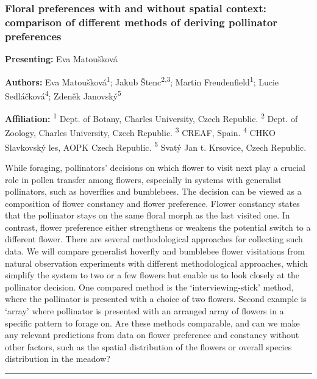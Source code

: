 \documentclass[
  letterpaper,
  DIV=11,
  numbers=noendperiod]{scrartcl}
\begin{document}
\subsubsection{Floral preferences with and without spatial context:
comparison of different methods of deriving pollinator
preferences}\label{floral-preferences-with-and-without-spatial-context-comparison-of-different-methods-of-deriving-pollinator-preferences}

\textbf{Presenting:} Eva Matoušková

\textbf{Authors:} Eva Matoušková\textsuperscript{1}; Jakub
Štenc\textsuperscript{2,3}; Martin Freudenfield\textsuperscript{1};
Lucie Sedláčková\textsuperscript{4}; Zdeněk Janovský\textsuperscript{5}

\textbf{Affiliation:} \textsuperscript{1} Dept. of Botany, Charles
University, Czech Republic. \textsuperscript{2} Dept. of Zoology,
Charles University, Czech Republic. \textsuperscript{3} CREAF, Spain.
\textsuperscript{4} CHKO Slavkovský les, AOPK Czech Republic.
\textsuperscript{5} Svatý Jan t. Krsovice, Czech Republic.

While foraging, pollinators' decisions on which flower to visit next
play a crucial role in pollen transfer among flowers, especially in
systems with generalist pollinators, such as hoverflies and bumblebees.
The decision can be viewed as a composition of flower constancy and
flower preference. Flower constancy states that the pollinator stays on
the same floral morph as the last visited one. In contrast, flower
preference either strengthens or weakens the potential switch to a
different flower. There are several methodological approaches for
collecting such data. We will compare generalist hoverfly and bumblebee
flower visitations from natural observation experiments with different
methodological approaches, which simplify the system to two or a few
flowers but enable us to look closely at the pollinator decision. One
compared method is the `interviewing-stick' method, where the pollinator
is presented with a choice of two flowers. Second example is `array'
where pollinator is presented with an arranged array of flowers in a
specific pattern to forage on. Are these methods comparable, and can we
make any relevant predictions from data on flower preference and
constancy without other factors, such as the spatial distribution of the
flowers or overall species distribution in the meadow?

\begin{center}\rule{0.5\linewidth}{0.5pt}\end{center}
\end{document}
